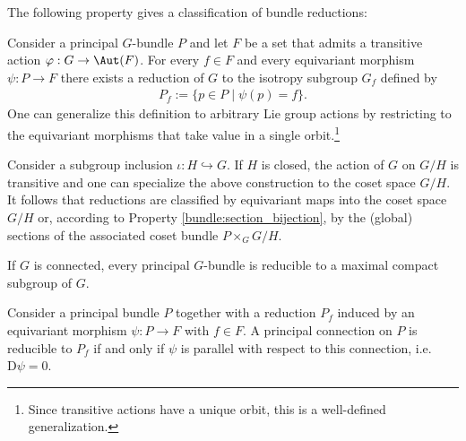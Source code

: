     The following property gives a classification of bundle reductions:
    \begin{property}\label{bundle:reduction_classification}
        Consider a principal $G$-bundle $P$ and let $F$ be a set that admits a transitive action $\varphi:G\rightarrow\Aut(F)$. For every $f\in F$ and every equivariant morphism $\psi:P\rightarrow F$ there exists a reduction of $G$ to the isotropy subgroup $G_f$ defined by
        \begin{gather}
            P_f := \{p\in P\mid\psi(p) = f\}.
        \end{gather}
        One can generalize this definition to arbitrary Lie group actions by restricting to the equivariant morphisms that take value in a single orbit.\footnote{Since transitive actions have a unique orbit, this is a well-defined generalization.}

        Consider a subgroup inclusion $\iota:H\hookrightarrow G$. If $H$ is closed, the action of $G$ on $G/H$ is transitive and one can specialize the above construction to the coset space $G/H$. It follows that reductions are classified by equivariant maps into the coset space $G/H$ or, according to Property \ref{bundle:section_bijection}, by the (global) sections of the associated coset bundle $P\times_GG/H$.
    \end{property}
    \begin{result}
        If $G$ is connected, every principal $G$-bundle is reducible to a maximal compact subgroup of $G$.
    \end{result}

    \begin{property}\label{bundle:connection_reducibility}
        Consider a principal bundle $P$ together with a reduction $P_f$ induced by an equivariant morphism $\psi:P\rightarrow F$ with $f\in F$. A principal connection on $P$ is reducible to $P_f$ if and only if $\psi$ is parallel with respect to this connection, i.e.~$\mathrm{D}\psi = 0$.
    \end{property}

